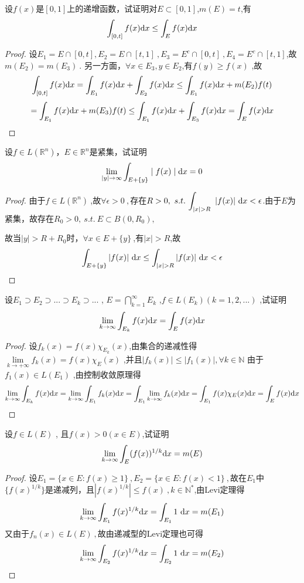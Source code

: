 设$f(x)$是$[0,1]$上的递增函数，试证明对$E \subset [0,1]$,$m(E)=t$,有$$\int_{[0,t]} f(x) \mathrm{d}x \leq \int_E f(x) \mathrm{d}x$$
\begin{proof}
设$E_1=E\cap[0,t], E_2=E\cap[t,1]\ ,E_3=E^c\cap[0,t]\ ,E_4=E^c\cap[t,1]$,故$m(E_2)=m(E_3)\ $.
另一方面，$\forall x\in E_3,y\in E_2$,有$f(y)\geq f(x)$
,故$$\int_{[0,t]}f(x)\mathrm{d}x=\int_{E_1}f(x)\mathrm{d}x+\int_{E_2}f(x)\mathrm{d}x\leq\int_{E_1}f(x)\mathrm{d}x+m(E_2)f(t)$$$$=\int_{E_1}f(x)\mathrm{d}x+m(E_3)f(t)\leq \int_{E_1}f(x)\mathrm{d}x+\int_{E_3}f(x)\mathrm{d}x=\int_{E}f(x)\mathrm{d}x$$
\end{proof}


设$f\in L(\mathbb{R}^n)$，$E\in \mathbb{R}^n$是紧集，试证明$$\lim\limits_{\mid y \mid \to \infty} \int_{E+\{y\}} \mid f(x) \mid \mathrm{d}x=0$$
\begin{proof}
由于$f\in L(\mathbb{R}^n) \ $,故$\forall \epsilon>0\ ,$存在$R>0,\ s.t.\ \displaystyle{\int_{|x|>R}\ |f(x)|\ \di{x}<\epsilon}$.由于$E$为紧集，故存在$R_0>0,\ s.t. \ E\subset B(0,R_0),$\par 故当$|y|>R+R_0$时，$\forall x\in E+\{y\}\ $,有$|x|>R$,故$$\int_{E+\{y\}}|f(x)|
\ \di{x\leq\int_{|x|>R}}|f(x)|\ \di{x<\epsilon}$$
\end{proof}


设$E_1 \supset E_2 \supset...\supset E_k \supset... $ , $ E=\bigcap\limits_{k=1}^{\infty}{E_k} $ ,$ f\in L(E_k)(k=1,2,...) $ ,试证明$$\lim\limits_{k \to \infty}\int_{E_k} f(x) \mathrm{d}x=\int_E f(x) \mathrm{d}x$$
\begin{proof}
设$f_k(x)=f(x)\chi_{E_k}(x)$,由集合的递减性得$\lim\limits_{k \to +\infty}f_k(x)=f(x)\chi_E(x) $ ,并且$\mid f_k(x)\mid \leq  \mid f_1(x)\mid ,\forall k \in \mathbb{N}$ 由于$f_1(x)\in L(E_1) $ ,由控制收敛原理得$$\lim\limits_{k \to \infty} \int_{E_k} f(x) \mathrm{d}x=\lim\limits_{k \to \infty} \int_{E_1} f_k(x) \mathrm{d}x= \int_{E_1} \lim\limits_{k \to \infty}f_k(x) \mathrm{d}x=\int_{E_1} f(x)\chi_E(x) \mathrm{d}x=\int_{E} f(x) \mathrm{d}x $$
\end{proof}


设$f\in L(E)$ , 且$f(x)>0(x \in E)$,试证明$$\lim\limits_{k \to \infty}\int_{E} (f(x))^{1/k} \mathrm{d}x=m(E)$$
\begin{proof}
设$E_1=\{x\in E:f(x)\geq1\}\ ,E_2=\{x\in E:f(x)<1\}\ ,$故在$E_1$中$\{f(x)^{1/k}\}$是递减列，且$|f(x)^{1/k}|\leq f(x)\ ,k \in \mathbb{N}^*$,由Levi定理得$$\lim\limits_{k\to\infty}\int_{E_1}f(x)^{1/k}\mathrm{d}x= \int_{E_1}1\ \mathrm{d}x=m(E_1)$$
又由于$f_n(x)\in L(E)\ ,$故由递减型的Levi定理也可得$$\lim\limits_{k\to\infty}\int_{E_2}f(x)^{1/k}\mathrm{d}x= \int_{E_2}1\ \mathrm{d}x=m(E_2)$$
\end{proof}

